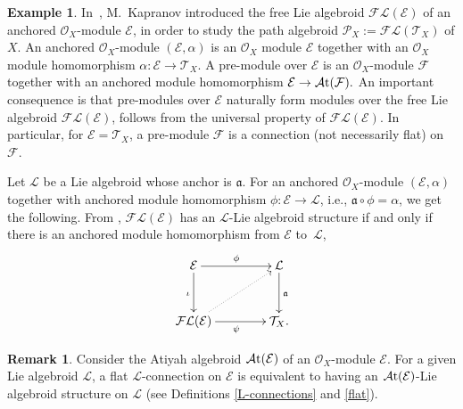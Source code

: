 \documentclass[pdftex]{sigma}
\numberwithin{equation}{section}
\theoremstyle{definition}
\newtheorem{Exm}[Thm]{Example}
\newtheorem{Rem}[Thm]{Remark}
\begin{document}
 \begin{Exm} \label{Free Lie algebroid} In~\cite{MK}, M.~Kapranov introduced the free Lie algebroid $\mathcal{FL}(\mathcal{E})$ of an anchored $\mathcal{O}_X$-module $\mathcal{E}$, in order to study the path algebroid $\mathcal{P}_X:=\mathcal{FL}(\mathcal{T}_X)$ of $X$. An anchored $\mathcal{O}_X$-module $(\mathcal{E}, \alpha)$ is an $\mathcal{O}_X$ module $\mathcal{E}$ together with an $\mathcal{O}_X$ module homomorphism $\alpha\colon \mathcal{E} \rightarrow \mathcal{T}_X$. A pre-module over $\mathcal{E}$ is an $\mathcal{O}_X$-module $\mathcal{F}$ together with an anchored module homomorphism $\mathcal{E} \rightarrow \mathcal{A}{\rm t}(\mathcal{F}).$
An important consequence is that pre-modules over $\mathcal{E}$ naturally form modules over the free Lie algebroid $\mathcal{FL}(\mathcal{E})$, follows from the universal property of $\mathcal{FL}(\mathcal{E})$. In particular, for $\mathcal{E}= \mathcal{T}_X$, a pre-module $\mathcal{F}$ is a connection (not necessarily flat) on $\mathcal{F}$.
	
Let $\mathcal{L}$ be a Lie algebroid whose anchor is $\mathfrak{a}$. For an anchored $\mathcal{O}_X$-module $(\mathcal{E}, \alpha)$ together with anchored module homomorphism $\phi\colon \mathcal{E} \rightarrow \mathcal{L}$, i.e., $\mathfrak{a} \circ \phi=\alpha$, we get the following. From \cite[Theorem~2.1.2]{MK},
	$\mathcal{FL}(\mathcal{E})$ has an $\mathcal{L}$-Lie algebroid structure if and only if there is an anchored module homomorphism from $\mathcal{E}$ to~$\mathcal{L}$,
\[
\xymatrix@C=4em@R=3em{
	{\mathcal{E}} \ar[r]^{\phi} \ar[d]_{\iota} &
	{\mathcal{L}} \ar[d]^{\mathfrak{a}} \\
	{\mathcal{FL}(\mathcal{E})} \ar[r]_{\psi} \ar@{.>}[ur] &
	{\mathcal{T}_X}.
}
\]
\end{Exm}
\begin{Rem} \label{Lie-Atiyah alg}
	Consider the Atiyah algebroid $\mathcal{A}{\rm t}(\mathcal{E})$ of an $\mathcal{O}_X$-module $\mathcal{E}$. For a given Lie algebroid $\mathcal{L}$, a flat $\mathcal{L}$-connection on $\mathcal{E}$ is equivalent to having an $\mathcal{A}{\rm t}(\mathcal{E})$-Lie algebroid structure on $\mathcal{L}$ (see Definitions \ref{L-connections} and \ref{flat}).
\end{Rem}
\end{document}
